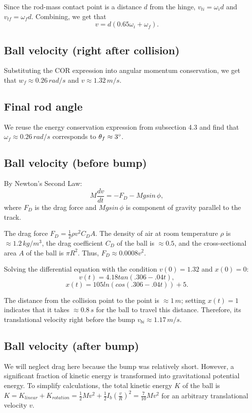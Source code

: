 \documentclass[12pt]{article} %
\begin{document}
Since the rod-mass contact point is a distance $d$ from the hinge, $v_{ti} = \omega_i d$ and $v_{tf} = \omega_f d$. Combining, we get that $$v = d(0.65\omega_i + \omega_f).$$

\subsection{Ball velocity (right after collision)}

Substituting the COR expression into angular momentum conservation, we get that $w_f \approx 0.26\,rad/s$ and $v \approx 1.32\,m/s$.

\subsection{Final rod angle}

We reuse the energy conservation expression from subsection 4.3 and find that $\omega_f \approx 0.26\,rad/s$ corresponds to $\theta_f \approx 3\degree$.

\subsection{Ball velocity (before bump)}

By Newton's Second Law:
$$M \frac{dv}{dt} = -F_D - Mgsin\,\phi,$$
where $F_D$ is the drag force and $Mgsin\,\phi$ is component of gravity parallel to the track.

The drag force $F_D = \frac{1}{2}\rho v^2 C_D A$. The density of air at room temperature $\rho$ is $\approx 1.2\,kg/m^3$, the drag coefficient $C_D$ of the ball is $\approx 0.5$, and the cross-sectional area $A$ of the ball is $\pi R^2$.
Thus, $F_D \approx 0.0008v^2$.

Solving the differential equation with the condition $v(0) = 1.32$ and $x(0) = 0$: $$v(t) = 4.18tan(.306 - .04t),$$ $$x(t) = 105ln(cos(.306 - .04t)) + 5.$$

The distance from the collision point to the point is $\approx 1\, m$; setting $x(t) = 1$ indicates that it takes $\approx 0.8\,s$ for the ball to travel this distance. Therefore, its translational velocity right before the bump $v_{bi} \approx 1.17\,m/s$.

\subsection{Ball velocity (after bump)}

We will neglect drag here because the bump was relatively short.
However, a significant fraction of kinetic energy is transformed into gravitational potential energy.
To simplify calculations, the total kinetic energy $K$ of the ball is $K = K_{linear} + K_{rotation} = \frac{1}{2}Mv^2 + \frac{1}{2}I_b(\frac{v}{R})^2 = \frac{7}{10}Mv^2$ for an arbitrary translational velocity $v$.
\end{document}

